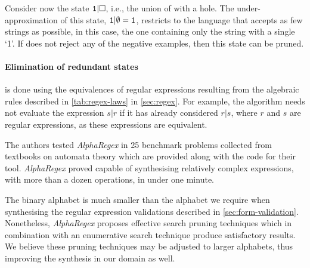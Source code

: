\begin{example}
Consider now the state \(\tt1|\Box\), i.e., the union of  with a hole. The under-approximation of this state, \(\tt1|\emptyset = 1\), restricts  to the language that accepts as few strings as possible, in this case, the one containing only the string with a single `1'. If  does not reject any of the negative examples, then this state can be pruned.
\end{example}

\paragraph{Elimination of redundant states} is done using the equivalences of regular expressions resulting from the algebraic rules described in \autoref{tab:regex-laws} in \autoref{sec:regex}. For example, the algorithm needs not evaluate the expression \(s\texttt{|}r\) if it has already considered \(r\texttt{|}s\), where \(r\) and \(s\) are regular expressions, as these expressions are equivalent.

\medskip

\noindent
The authors tested \textit{AlphaRegex} in 25 benchmark problems collected from textbooks on automata theory which are provided along with the code for their tool.
\textit{AlphaRegex} proved capable of synthesising relatively complex expressions, with more than a dozen operations, in under one minute.

\medskip

The binary alphabet is much smaller than the alphabet we require when synthesising the regular expression validations described in \autoref{sec:form-validation}. Nonetheless, \textit{AlphaRegex} proposes effective search pruning techniques which in combination with an enumerative search technique produce satisfactory results.
We believe these pruning techniques may be adjusted to larger alphabets, thus improving the synthesis in our domain as well.

\begin{comment}
\subsection{Synthesising Conditionals} \cite{DBLP:journals/pacmpl/ShiSL19}?
Condition abduction:

Used in many tools (under different names):

FlashFill [Gulwani '11]

Escher [Albarghouthi et al. '13] \cite{Escher}

Leon [Kneuss et al. '13]

Synquid [Polikarpova et al. '13]

EUSolver [Alur et al. '17]

From Flashfill: 

There are two important components that enable learning of conditionals: partitioning of input-output examples into disjoint partitions, and learning classifiers based on inputs for those partitions. The classifiers provide the
conditionals, while the intersection of the trace sets associated with
various inputs in a partition yields the computational branch for the
corresponding conditional.
\end{comment}